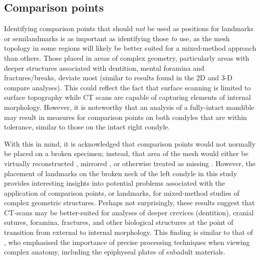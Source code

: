 \documentclass[review]{elsarticle}
\begin{document}
\subsection*{Comparison points}

Identifying comparison points that should \textit{not} be used as positions for landmarks or semilandmarks is as important as identifying those \textit{to} use, as the mesh topology in some regions will likely be better suited for a mixed-method approach than others. Those placed in areas of complex geometry, particularly areas with deeper structures associated with dentition, mental foramina and fractures/breaks, deviate most (similar to results found in the 2D and 3-D compare analyses). This could reflect the fact that surface scanning is limited to surface topography while CT scans are capable of capturing elements of internal morphology. However, it is noteworthy that an analysis of a fully-intact mandible may result in measures for comparison points on both condyles that are within tolerance, similar to those on the intact right condyle. 

With this in mind, it is acknowledged that comparison points would not normally be placed on a broken specimen; instead, that area of the mesh would either be virtually reconstructed \citep{RN11496,RN5889,Heid1,RN5903,RN5904}, mirrored \citep{RN11504}, or otherwise treated as missing \citep{RN11500,RN11497,RN11498,RN11499}. However, the placement of landmarks on the broken neck of the left condyle in this study provides interesting insights into potential problems associated with the application of comparison points, or landmarks, for mixed-method studies of complex geometric structures. Perhaps not surprisingly, these results suggest that CT-scans may be better-suited for analyses of deeper crevices (dentition), cranial sutures, foramina, fractures, and other biological structures at the point of transition from external to internal morphology. This finding is similar to that of \citet{RN8984}, who emphasised the importance of precise processing techniques when viewing complex anatomy, including the epiphyseal plates of subadult materials.
\end{document}
